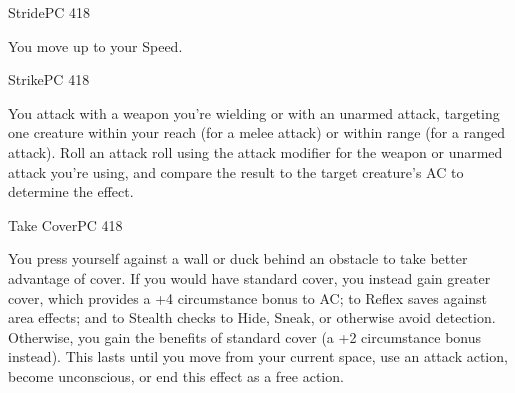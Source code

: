 \documentclass[12pt,openany,twocolumn]{book}
\begin{document}
\begin{action}{Stride}{}{PC 418}
    \begin{actioninfo}
    \end{actioninfo}

    \begin{actionbody}
        You move up to your Speed.
    \end{actionbody}
\end{action}

\begin{action}{Strike}{}{PC 418}
    \begin{actioninfo}
    \end{actioninfo}

    \begin{actionbody}
        You attack with a weapon you're wielding or with an unarmed attack, targeting one creature within your reach (for a melee attack) or within range (for a ranged attack). Roll an attack roll using the attack modifier for the weapon or unarmed attack you're using, and compare the result to the target creature's AC to determine the effect.
    \end{actionbody}


\end{action}

\begin{action}{Take Cover}{}{PC 418}
    \begin{actioninfo}
    \end{actioninfo}

    \begin{actionbody}
        You press yourself against a wall or duck behind an obstacle to take better advantage of cover. If you would have standard cover, you instead gain greater cover, which provides a +4 circumstance bonus to AC; to Reflex saves against area effects; and to Stealth checks to Hide, Sneak, or otherwise avoid detection. Otherwise, you gain the benefits of standard cover (a +2 circumstance bonus instead). This lasts until you move from your current space, use an attack action, become unconscious, or end this effect as a free action.
    \end{actionbody}
\end{action}
\end{document}
